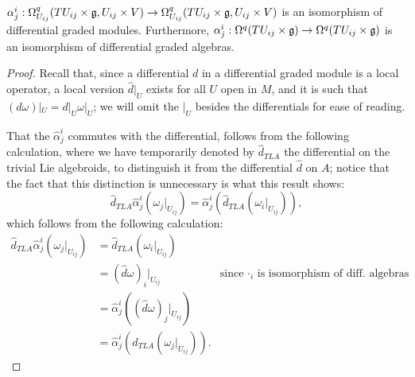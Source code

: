 \begin{theorem}\label{theoremHatAlphaRespectsDifferentialAndWedgeIsomorphismOfModulesAndAlgebra}
$\alpha^i_j: \Omega_{U_{ij}}^q(TU_{ij}\times \mathfrak{g}, U_{ij}\times V) \to \Omega_{U_{ij}}^q(TU_{ij}\times \mathfrak{g}, U_{ij}\times V)$ is an isomorphism of differential graded modules. Furthermore, $\alpha^i_j: \Omega^q(TU_{ij}\times \mathfrak{g}) \to \Omega^q(TU_{ij}\times \mathfrak{g})$ is an isomorphism of differential graded algebras.
\end{theorem}
\begin{proof}
Recall that, since a differential $d$ in a differential graded module is a local operator, a local version $\hat d|_U$ exists for all $U$ open in $M$, and it is such that $(d\omega)|_U = d|_U \omega|_U$; we will omit the $|_U$ besides the differentials for ease of reading.

That the $\hat \alpha^i_j$ commutes with the differential, follows from the following calculation, where we have temporarily denoted by $\hat d_{TLA}$ the differential on the trivial Lie algebroids, to distinguish it from the differential $\hat d$ on $A$; notice that the fact that this distinction is unnecessary is what this result shows:
\begin{equation*}
    \hat d_{TLA} \hat \alpha^i_j(\omega_j|_{U_{ij}}) = \hat \alpha^i_j(\hat d_{TLA} (\omega_i|_{U_{ij}})),
\end{equation*} which follows from the following calculation:
\begin{align*}
    \hat d_{TLA} \hat \alpha^i_j(\omega_j|_{U_{ij}})
    &= \hat d_{TLA} (\omega_i|_{U_{ij}}) \\
    &= (\hat d \omega)_i|_{U_{ij}} & \text{since $\cdot_{i}$ is isomorphism of diff. algebras}\\
    &= \hat \alpha^i_j((\hat d \omega)_j|_{U_{ij}}) \\
    &= \hat \alpha^i_j(\hat d_{TLA} (\omega_j|_{U_{ij}})).
\end{align*}


\end{proof}
